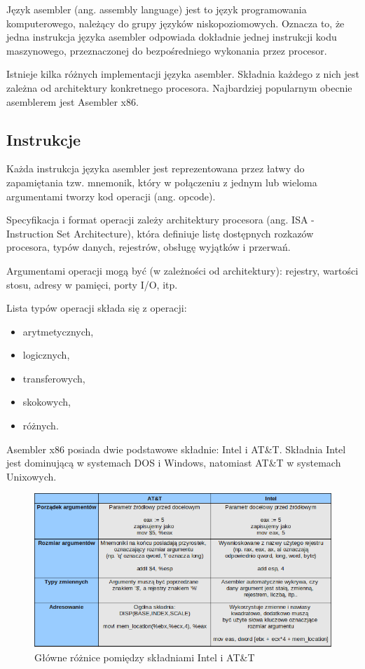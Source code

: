 \documentclass[a4paper,12pt,twoside]{article}
\begin{document}
Język asembler (ang. assembly language) jest to język programowania komputerowego, należący do grupy języków niskopoziomowych. Oznacza to, że jedna instrukcja języka asembler odpowiada dokładnie jednej instrukcji kodu maszynowego, przeznaczonej do bezpośredniego wykonania przez procesor.

Istnieje kilka różnych implementacji języka asembler. Składnia każdego z nich jest zależna od architektury konkretnego procesora. Najbardziej popularnym obecnie asemblerem jest Asembler x86.

\subsection{Instrukcje}

Każda instrukcja języka asembler jest reprezentowana przez łatwy do zapamiętania tzw. mnemonik, który w połączeniu z jednym lub wieloma argumentami tworzy kod operacji (ang. opcode).

Specyfikacja i format operacji zależy architektury procesora (ang. ISA - Instruction Set Architecture), która definiuje listę dostępnych rozkazów procesora, typów danych, rejestrów, obsługę wyjątków i przerwań.

Argumentami operacji mogą być (w zależności od architektury): rejestry, wartości stosu, adresy w pamięci, porty I/O, itp.

Lista typów operacji składa się z operacji:
\begin{itemize}
\item arytmetycznych,
\item logicznych,
\item transferowych,
\item skokowych,
\item różnych.
\end{itemize}

Asembler x86 posiada dwie podstawowe składnie: Intel i AT\&T. Składnia Intel jest dominującą w systemach DOS i Windows, natomiast AT\&T w systemach Unixowych\cite{asm_syn}.

\begin{figure}[h!]
\centering
\includegraphics[scale=0.6]{gfx/asm_syn_diff.png}
\caption{Główne różnice pomiędzy składniami Intel i AT\&T\cite{asm_syn}}
\end{figure}
\end{document}
